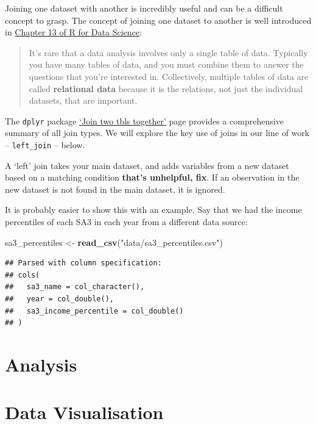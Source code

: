 \documentclass[]{book}
\newenvironment{Shaded}{\begin{snugshade}}{\end{snugshade}}
\newcommand{\KeywordTok}[1]{\textcolor[rgb]{0.13,0.29,0.53}{\textbf{#1}}}
\newcommand{\NormalTok}[1]{#1}
\newcommand{\StringTok}[1]{\textcolor[rgb]{0.31,0.60,0.02}{#1}}
\begin{document}
Joining one dataset with another is incredibly useful and can be a difficult concept to grasp. The concept of joining one dataset to another is well introduced in \href{https://r4ds.had.co.nz/relational-data.html}{Chapter 13 of R for Data Science}:

\begin{quote}
It's rare that a data analysis involves only a single table of data. Typically you have many tables of data, and you must combine them to answer the questions that you're interested in. Collectively, multiple tables of data are called \textbf{relational data} because it is the relations, not just the individual datasets, that are important.
\end{quote}

The \texttt{dplyr} package \href{https://dplyr.tidyverse.org/reference/join.html}{`Join two tbls together'} page provides a comprehensive summary of all join types. We will explore the key use of joins in our line of work -- \texttt{left\_join} -- below.

A `left' join takes your main dataset, and adds variables from a new dataset based on a matching condition \textbf{that's unhelpful, fix}. If an observation in the new dataset is not found in the main dataset, it is ignored.

It is probably easier to show this with an example. Say that we had the income percentiles of each SA3 in each year from a different data source:

\begin{Shaded}
\begin{Highlighting}[]
\NormalTok{sa3_percentiles <-}\StringTok{ }\KeywordTok{read_csv}\NormalTok{(}\StringTok{"data/sa3_percentiles.csv"}\NormalTok{)}
\end{Highlighting}
\end{Shaded}

\begin{verbatim}
## Parsed with column specification:
## cols(
##   sa3_name = col_character(),
##   year = col_double(),
##   sa3_income_percentile = col_double()
## )
\end{verbatim}

\hypertarget{analysis}{%
\chapter{Analysis}\label{analysis}}

\hypertarget{data-visualisation}{%
\chapter{Data Visualisation}\label{data-visualisation}}
\end{document}
